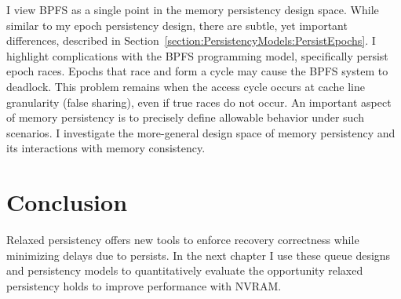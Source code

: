 I view BPFS as a single point in the memory persistency design space.
While similar to my epoch persistency design, there are subtle, yet important differences, described in Section~\ref{section:PersistencyModels:PersistEpochs}.
I highlight complications with the BPFS programming model, specifically persist epoch races.
Epochs that race and form a cycle may cause the BPFS system to deadlock.
This problem remains when the access cycle occurs at cache line granularity (false sharing), even if true races do not occur.
An important aspect of memory persistency is to precisely define allowable behavior under such scenarios.
I investigate the more-general design space of memory persistency and its interactions with memory consistency.

\section{Conclusion}
\label{sec:PersistencyModels:Conclusion}

Relaxed persistency offers new tools to enforce recovery correctness while minimizing delays due to persists.
In the next chapter I use these queue designs and persistency models to quantitatively evaluate the opportunity relaxed persistency holds to improve performance with NVRAM.
